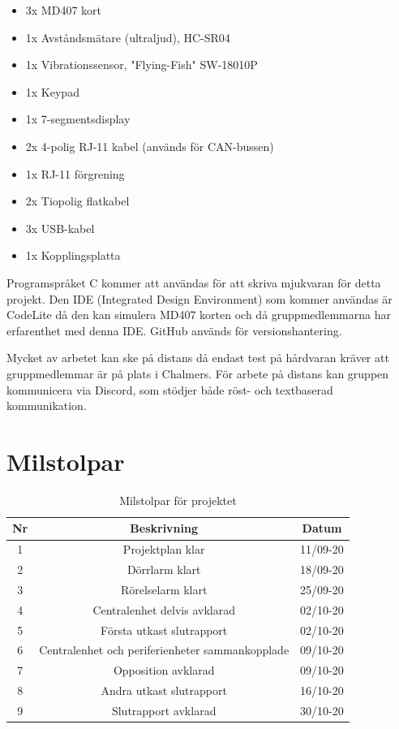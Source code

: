 \documentclass[a4paper]{article}
\begin{document}
\begin{itemize}
    \item 3x MD407 kort
    \item 1x Avståndsmätare (ultraljud), HC-SR04
    \item 1x Vibrationssensor, "Flying-Fish" SW-18010P
    \item 1x Keypad
    \item 1x 7-segmentsdisplay
    \item 2x 4-polig RJ-11 kabel (används för CAN-bussen)
    \item 1x RJ-11 förgrening
    \item 2x Tiopolig flatkabel
    \item 3x USB-kabel
    \item 1x Kopplingsplatta
\end{itemize}

Programspråket C kommer att användas för att skriva mjukvaran för detta projekt. Den IDE (Integrated Design Environment) som kommer användas är CodeLite då den kan simulera MD407 korten och då gruppmedlemmarna har erfarenthet med denna IDE. GitHub används för versionshantering.

Mycket av arbetet kan ske på distans då endast test på hårdvaran kräver att gruppmedlemmar är på plats i Chalmers. För arbete på distans kan gruppen kommunicera via Discord, som stödjer både röst- och textbaserad kommunikation.

\section{Milstolpar}


\begin{table}[H]
    \centering
        \begin{tabular}{ |c|c|c| }\hline
            Nr & Beskrivning & Datum \\\hline\hline
            1 & Projektplan klar & 11/09-20 \\\hline
            2 & Dörrlarm klart & 18/09-20 \\\hline
            3 & Rörelselarm klart & 25/09-20 \\\hline
            4 & Centralenhet delvis avklarad & 02/10-20 \\\hline
            5 & Första utkast slutrapport & 02/10-20 \\\hline
            6 & Centralenhet och periferienheter sammankopplade & 09/10-20 \\\hline
            7 & Opposition avklarad & 09/10-20 \\\hline
            8 & Andra utkast slutrapport & 16/10-20 \\\hline
            9 & Slutrapport avklarad & 30/10-20 \\\hline
        \end{tabular}
        \caption{Milstolpar för projektet}
        \label{table:milstolpar}
\end{table}
\end{document}
